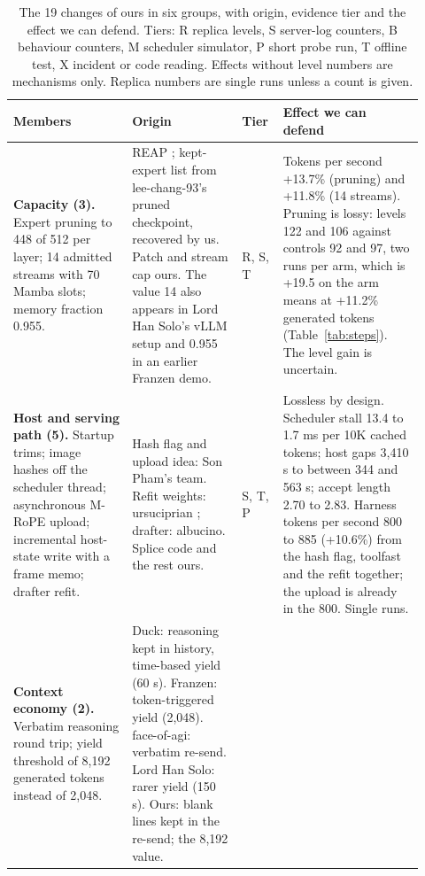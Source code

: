 \begin{table}[!htb]
\caption{The 19 changes of ours in six groups, with origin, evidence tier and the effect we can defend. Tiers: R replica levels, S server-log counters, B behaviour counters, M scheduler simulator, P short probe run, T offline test, X incident or code reading. Effects without level numbers are mechanisms only. Replica numbers are single runs unless a count is given.}\label{tab:components}
\centering\footnotesize
\setlength{\tabcolsep}{3pt}
\renewcommand{\arraystretch}{1.1}
\begin{tabular}{@{}>{\raggedright\arraybackslash}p{0.27\linewidth}>{\raggedright\arraybackslash}p{0.25\linewidth}>{\raggedright\arraybackslash}p{0.08\linewidth}>{\raggedright\arraybackslash}p{0.32\linewidth}@{}}
\toprule
Members & Origin & Tier & Effect we can defend \\
\midrule
\textbf{Capacity (3).}
Expert pruning to 448 of 512 per layer; 14 admitted streams with 70 Mamba slots; memory fraction 0.955.
&
REAP \citep{lasby2025reap}; kept-expert list from lee-chang-93's pruned checkpoint, recovered by us. Patch and stream cap ours. The value 14 also appears in Lord Han Solo's vLLM setup and 0.955 in an earlier Franzen demo. %
&
R, S, T
&
Tokens per second +13.7\% (pruning) and +11.8\% (14 streams). Pruning is lossy: levels 122 and 106 against controls 92 and 97, two runs per arm, which is +19.5 on the arm means at +11.2\% generated tokens (Table~\ref{tab:steps}). The level gain is uncertain. %
\\[3pt]
\textbf{Host and serving path (5).}
Startup trims; image hashes off the scheduler thread; asynchronous M-RoPE upload; incremental host-state write with a frame memo; drafter refit.
&
Hash flag and upload idea: Son Pham's team. Refit weights: ursuciprian \citep{ursuciprian2026d3}; drafter: albucino. Splice code and the rest ours.
&
S, T, P
&
Lossless by design. Scheduler stall 13.4 to 1.7 ms per 10K cached tokens; host gaps 3,410 s to between 344 and 563 s; accept length 2.70 to 2.83. Harness tokens per second 800 to 885 (+10.6\%) from the hash flag, toolfast and the refit together; the upload is already in the 800. Single runs. %
\\[3pt]
\textbf{Context economy (2).}
Verbatim reasoning round trip; yield threshold of 8,192 generated tokens instead of 2,048.
&
Duck: reasoning kept in history, time-based yield (60 s). Franzen: token-triggered yield (2,048). face-of-agi: verbatim re-send. Lord Han Solo: rarer yield (150 s). Ours: blank lines kept in the re-send; the 8,192 value. %

\end{tabular}
\end{table}
